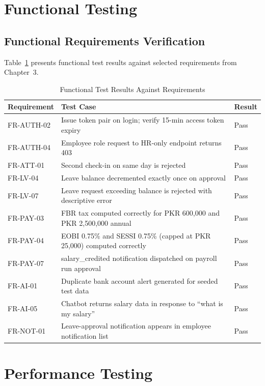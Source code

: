 \documentclass[12pt,a4paper]{report}
\begin{document}
\section{Functional Testing}

\subsection{Functional Requirements Verification}

Table~\ref{tab:functional_tests} presents functional test results against selected requirements from Chapter~3.

\begin{table}[H]
\centering
\caption{Functional Test Results Against Requirements}
\label{tab:functional_tests}
\begin{tabular}{|l|p{5.5cm}|l|}
\hline
\textbf{Requirement} & \textbf{Test Case} & \textbf{Result} \\
\hline
FR-AUTH-02 & Issue token pair on login; verify 15-min access token expiry & Pass \\
\hline
FR-AUTH-04 & Employee role request to HR-only endpoint returns 403 & Pass \\
\hline
FR-ATT-01  & Second check-in on same day is rejected & Pass \\
\hline
FR-LV-04   & Leave balance decremented exactly once on approval & Pass \\
\hline
FR-LV-07   & Leave request exceeding balance is rejected with descriptive error & Pass \\
\hline
FR-PAY-03  & FBR tax computed correctly for PKR 600,000 and PKR 2,500,000 annual & Pass \\
\hline
FR-PAY-04  & EOBI 0.75\% and SESSI 0.75\% (capped at PKR 25,000) computed correctly & Pass \\
\hline
FR-PAY-07  & salary\_credited notification dispatched on payroll run approval & Pass \\
\hline
FR-AI-01   & Duplicate bank account alert generated for seeded test data & Pass \\
\hline
FR-AI-05   & Chatbot returns salary data in response to ``what is my salary'' & Pass \\
\hline
FR-NOT-01  & Leave-approval notification appears in employee notification list & Pass \\
\hline
\end{tabular}
\end{table}

\section{Performance Testing}
\end{document}

